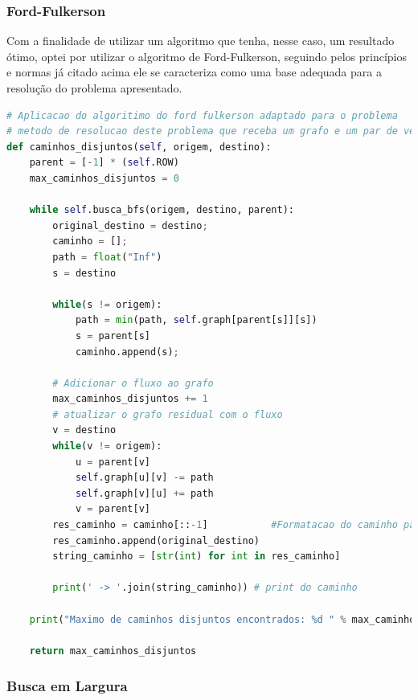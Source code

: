\subsubsection{Ford-Fulkerson}

Com a finalidade de utilizar um algoritmo que tenha, nesse caso, um resultado ótimo, optei por utilizar o algoritmo de Ford-Fulkerson, seguindo pelos princípios e normas já citado acima ele se caracteriza como uma base adequada para a resolução do problema apresentado.

\begin{scriptsize}
\estiloJava
\begin{lstlisting}[title={Algoritmo baseado no Ford-Fulkerson}, label=lst:javacode, language=Python]
# Aplicacao do algoritimo do ford fulkerson adaptado para o problema
# metodo de resolucao deste problema que receba um grafo e um par de vértices
def caminhos_disjuntos(self, origem, destino):
    parent = [-1] * (self.ROW)
    max_caminhos_disjuntos = 0
    
    while self.busca_bfs(origem, destino, parent):
        original_destino = destino;
        caminho = [];
        path = float("Inf")
        s = destino
        
        while(s != origem):
            path = min(path, self.graph[parent[s]][s])
            s = parent[s]
            caminho.append(s);
        
        # Adicionar o fluxo ao grafo
        max_caminhos_disjuntos += 1   
        # atualizar o grafo residual com o fluxo
        v = destino
        while(v != origem):
            u = parent[v]
            self.graph[u][v] -= path
            self.graph[v][u] += path
            v = parent[v]
        res_caminho = caminho[::-1]           #Formatacao do caminho para printar corretamente
        res_caminho.append(original_destino)
        string_caminho = [str(int) for int in res_caminho]

        print(' -> '.join(string_caminho)) # print do caminho

    print("Maximo de caminhos disjuntos encontrados: %d " % max_caminhos_disjuntos)

    return max_caminhos_disjuntos
\end{lstlisting}
\end{scriptsize}


\subsubsection{Busca em Largura}


